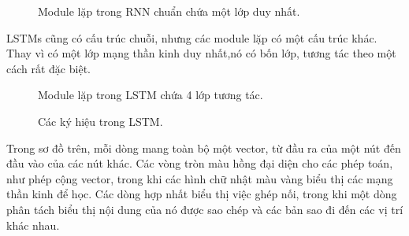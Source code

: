 \begin{figure}[H]
    \caption{\label{fig:lstm3-simpleRNN} Module lặp trong RNN chuẩn chứa một lớp duy nhất.}
\end{figure}

LSTMs cũng có cấu trúc chuỗi, nhưng các module lặp có một cấu trúc khác. Thay vì có một lớp
mạng thần kinh duy nhất,nó có bốn lớp, tương tác theo một cách rất đặc biệt.

\begin{figure}[H]
    \caption{\label{fig:lstm3-chain} Module lặp trong LSTM chứa 4 lớp tương tác.}
\end{figure}

\begin{figure}[H]
    \caption{\label{fig:lstm2-notation} Các ký hiệu trong LSTM.}
\end{figure}

Trong sơ đồ trên, mỗi dòng mang toàn bộ một vector, từ đầu ra của một nút đến đầu vào của các nút khác. Các vòng tròn
màu hồng đại diện cho các phép toán, như phép cộng vector, trong khi các hình chữ nhật màu vàng biểu thị các mạng
thần kinh để học. Các dòng hợp nhất biểu thị việc ghép nối, trong khi một dòng phân tách biểu thị nội dung của nó được
sao chép và các bản sao đi đến các vị trí khác nhau.

